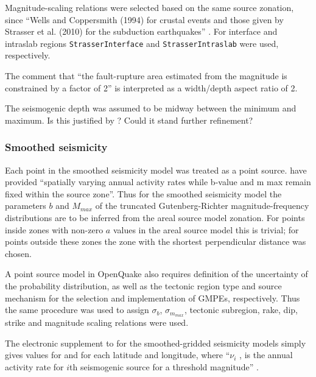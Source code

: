 \documentclass{article}
\begin{document}
Magnitude-scaling relations were selected based on the same source zonation, since ``Wells and Coppersmith (1994) for crustal events and those given by
Strasser et al. (2010) for the subduction earthquakes'' \citep[p.~140]{nath2012probabilistic}. For interface and intraslab regions \texttt{StrasserInterface} and \texttt{StrasserIntraslab} were used, respectively. 

The comment that ``the fault-rupture area estimated from the magnitude is constrained by a factor of 2'' \citep[p.~140]{nath2012probabilistic} is interpreted as a width/depth aspect ratio of 2.

The seismogenic depth was assumed to be midway between the minimum and maximum. Is this justified by \cite{thingbaijam2011seismogenic}? Could it stand further refinement?


\subsubsection{Smoothed seismicity}
\label{sec:Smoothed}

\cite{thingbaijam2011seismogenic}

Each point in the smoothed seismicity model was treated as a point source. \cite{nath2012probabilistic} have provided ``spatially varying annual activity rates while b-value and m max remain fixed within the source zone''. Thus for the smoothed seismicity model the parameters $b$ and $M_{max}$ of the truncated Gutenberg-Richter magnitude-frequency distributions are to be inferred from the areal source model zonation. For points inside zones with non-zero $a$ values in the areal source model this is trivial; for points outside these zones the zone with the shortest perpendicular distance was chosen.

A point source model in OpenQuake also requires definition of the uncertainty of the probability distribution, as well as the tectonic region type and source mechanism for the selection and implementation of GMPEs, respectively. Thus the same procedure was used to assign $\sigma_b$, $\sigma_{m_{max}}$, tectonic subregion, rake, dip, strike and magnitude scaling relations were used.

The electronic supplement to \cite{nath2012probabilistic} for the smoothed-gridded seismicity models simply gives values for \texttt{} and \texttt{} for each latitude and longitude, where ``$\nu_i$ , is the annual activity rate for $i$th seismogenic source for a threshold magnitude'' \cite[p.~140]{nath2012probabilistic}.
\end{document}
